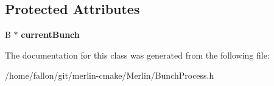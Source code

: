 \subsection*{Protected Attributes}
\begin{DoxyCompactItemize}
\item 
\mbox{\label{classTBunchProc_ae6d339f98a63d59eb56bf2a26d56a9ba}} 
B $\ast$ {\bfseries current\+Bunch}
\end{DoxyCompactItemize}


The documentation for this class was generated from the following file\+:\begin{DoxyCompactItemize}
\item 
/home/fallon/git/merlin-\/cmake/\+Merlin/Bunch\+Process.\+h\end{DoxyCompactItemize}
